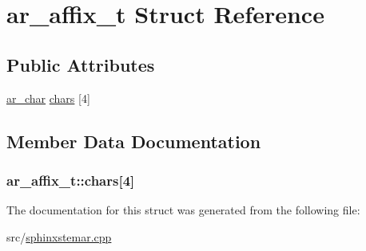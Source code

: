 \hypertarget{structar__affix__t}{\section{ar\-\_\-affix\-\_\-t Struct Reference}
\label{structar__affix__t}
}
\subsection*{Public Attributes}
\begin{DoxyCompactItemize}
\item 
\hyperlink{sphinxstemar_8cpp_a9233a39c6839212116cc51040cc9f962}{ar\-\_\-char} \hyperlink{structar__affix__t_ad0153cf9f31a851b480c29e228b918a7}{chars} \mbox{[}4\mbox{]}
\end{DoxyCompactItemize}


\subsection{Member Data Documentation}
\hypertarget{structar__affix__t_ad0153cf9f31a851b480c29e228b918a7}{
\subsubsection[{chars}]{ ar\-\_\-affix\-\_\-t\-::chars\mbox{[}4\mbox{]}}}\label{structar__affix__t_ad0153cf9f31a851b480c29e228b918a7}


The documentation for this struct was generated from the following file\-:\begin{DoxyCompactItemize}
\item 
src/\hyperlink{sphinxstemar_8cpp}{sphinxstemar.\-cpp}\end{DoxyCompactItemize}

